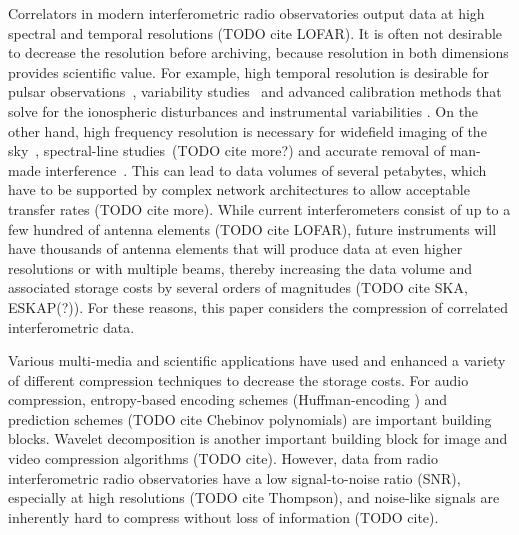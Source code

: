 \documentclass{article}
\begin{document}
Correlators in modern interferometric radio observatories output data at high spectral and temporal resolutions \cite{evla-perley-2011,mwa-2013-tingay,atca-broadband-backend-2011} (TODO cite LOFAR). It is often not desirable to decrease the resolution before archiving, because resolution in both dimensions provides scientific value. For example, high temporal resolution is desirable for pulsar observations~\cite{ska-pulsars-2009}, variability studies~\cite{lofar-pulsars-and-transients-2011} and advanced calibration methods that solve for the ionospheric disturbances and instrumental variabilities \cite{kazemi-clustered-cal-2013,revisiting-me-ii}. On the other hand, high frequency resolution is necessary for widefield imaging of the sky~\cite{big-book-on-synthesis-imaging}, spectral-line studies~\cite{evla-high-resolution-lines}(TODO cite more?) and accurate removal of man-made interference~\cite{lofar-radio-environment}. This can lead to data volumes of several petabytes, which have to be supported by complex network architectures to allow acceptable transfer rates \cite{lofar-processing-arch-2005} (TODO cite more). While current interferometers consist of up to a few hundred of antenna elements \cite{evla-perley-2011,mwa-2013-tingay,atca-broadband-backend-2011} (TODO cite LOFAR), future instruments will have thousands of antenna elements that will produce data at even higher resolutions or with multiple beams, thereby increasing the data volume and associated storage costs by several orders of magnitudes \cite{apertif-2010} (TODO cite SKA, ESKAP(?)). For these reasons, this paper considers the compression of correlated interferometric data.

Various multi-media and scientific applications have used and enhanced a variety of different compression techniques to decrease the storage costs. For audio compression, entropy-based encoding schemes (Huffman-encoding \cite{huffman}) and prediction schemes (TODO cite Chebinov polynomials) are important building blocks. Wavelet decomposition is another important building block for image and video compression algorithms (TODO cite). However, data from radio interferometric radio observatories have a low signal-to-noise ratio (SNR), especially at high resolutions (TODO cite Thompson), and noise-like signals are inherently hard to compress without loss of information (TODO cite).


\end{document}

